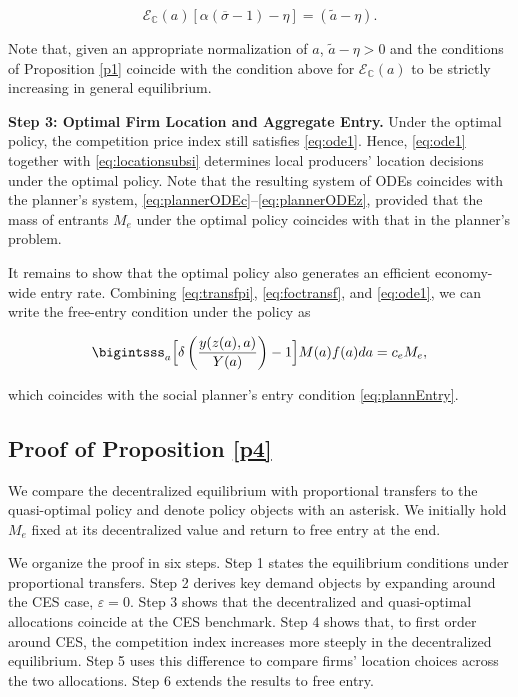 \begin{equation*}
\mathcal{E}_{\mathbb{C}}(a) \left[\alpha(\overline{\sigma} - 1)  - \eta \right] = (\widetilde{a} - \eta).
\end{equation*}

Note that, given an appropriate normalization of $a$, $\tilde{a} - \eta > 0$ and the conditions of Proposition \ref{p1} coincide with the condition above for $\mathcal{E}_{\mathbb{C}}(a)$ to be strictly increasing in general equilibrium.

\textbf{Step 3: Optimal Firm Location and Aggregate Entry.}
Under the optimal policy, the competition price index still satisfies \eqref{eq:ode1}. Hence, \eqref{eq:ode1} together with \eqref{eq:locationsubsi} determines local producers’ location decisions under the optimal policy. Note that the resulting system of ODEs coincides with the planner’s system, \eqref{eq:plannerODEc}–\eqref{eq:plannerODEz}, provided that the mass of entrants $M_e$ under the optimal policy coincides with that in the planner’s problem.

It remains to show that the optimal policy also generates an efficient economy-wide entry rate. Combining \eqref{eq:transfpi}, \eqref{eq:foctransf}, and \eqref{eq:ode1}, we can write the free-entry condition under the policy as

\begin{equation*}
\bigintsss_a \Big[ \delta\left(\frac{y(z(a),a)}{Y(a)}\right) - 1 \Big] M(a) f(a) da = c_e M_e,
\end{equation*}

which coincides with the social planner’s entry condition \eqref{eq:plannEntry}.

\subsection{Proof of Proposition \ref{p4}}\label{p:comparison}
We compare the decentralized equilibrium with proportional transfers to the quasi-optimal policy and denote policy objects with an asterisk. We initially hold $M_e$ fixed at its decentralized value and return to free entry at the end.

We organize the proof in six steps. Step 1 states the equilibrium conditions under proportional transfers. Step 2 derives key demand objects by expanding around the CES case, $\varepsilon=0$. Step 3 shows that the decentralized and quasi-optimal allocations coincide at the CES benchmark. Step 4 shows that, to first order around CES, the competition index increases more steeply in the decentralized equilibrium. Step 5 uses this difference to compare firms’ location choices across the two allocations. Step 6 extends the results to free entry.

